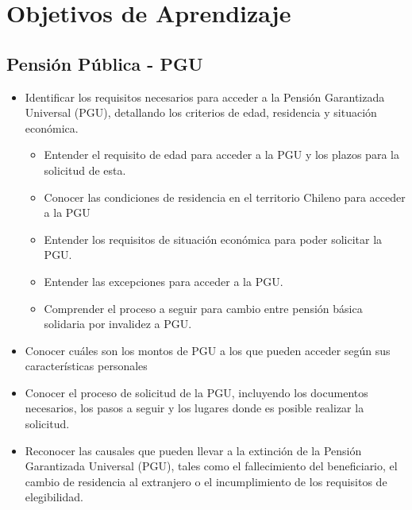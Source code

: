 \section{Objetivos de Aprendizaje}
\subsection{Pensión Pública - PGU}
\begin{itemize}
    \item Identificar los requisitos necesarios para acceder a la Pensión Garantizada Universal (PGU), detallando los criterios de edad, residencia y situación económica.
    \begin{itemize}
        \item Entender el requisito de edad para acceder a la PGU y los plazos para la solicitud de esta. 
        \item Conocer las condiciones de residencia en el territorio Chileno para acceder a la PGU
        \item Entender los requisitos de situación económica para poder solicitar la PGU. %
        \item Entender las excepciones para acceder a la PGU. 
        \item Comprender el proceso a seguir para cambio entre pensión básica solidaria por invalidez a PGU. 
    \end{itemize}
     \item Conocer cuáles son los montos de PGU a los que pueden acceder según sus características personales %
    \item Conocer el proceso de solicitud de la PGU, incluyendo los documentos necesarios, los pasos a seguir y los lugares donde es posible realizar la solicitud. 
    \item Reconocer las causales que pueden llevar a la extinción de la Pensión Garantizada Universal (PGU), tales como el fallecimiento del beneficiario, el cambio de residencia al extranjero o el incumplimiento de los requisitos de elegibilidad. 


\end{itemize}
